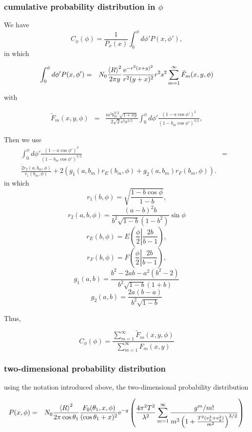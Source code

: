 \documentclass[11pt]{article}
\newcommand{\e}{{\rm e}}
\begin{document}
{{{{%
\subsubsection{cumulative probability distribution in $\phi$}

We have
$$C_{\phi}(\phi)=\frac{1}{P_x(x)}\int_{0}^{\phi}d\phi'P(x,\phi'),$$
in which


\begin{eqnarray}
\int_{0}^{\phi}d\phi'P(x,\phi')&=&N_{0}\frac{\left<R\right>^{2}}{2\pi y}\frac{\e^{-r^{2}(x+y)^{2}}}{r^{2}(y+x)^{2}}
r^{2}s^{2}
\sum_{m=1}^{\infty}\tilde {F}_{m}(x,y,\phi)
\end{eqnarray}

with

\begin{eqnarray} \tilde F_{m}(x,y,\phi)&=&\frac{m^{3}b_{m}^{3/2}\sqrt{1+xy}}{2\sqrt{2}s^{3}a^{3/2}}\int_{0}^{\phi}d\phi'\frac{\left(1-a\cos\phi'\right)^{2}}{(1-b_m\cos\phi')^{3/2}},
\end{eqnarray}


Then we use
\begin{eqnarray}
\int_{0}^{\phi}d\phi'\frac{\left(1-a\cos\phi' \right)^{2}}{(1-b_m\cos\phi')^{3/2}}&=&\\
\frac{2r_{2}(a,b_m,\phi)}{r_{1}(b_m,\phi)}+2(g_{1}(a,b_m)r_{E}(b_m,\phi)+g_{2}(a,b_m)r_{F}(b_m,\phi)).
\end{eqnarray}
in which
$$r_{1}(b,\phi)=\sqrt{\frac{1-b\cos\phi}{1-b}},$$
$$r_{2}(a,b,\phi)=\frac{(a-b)^{2}b}{b^{2}\sqrt{1-b}(1-b^{2})}\sin\phi$$
$$r_{E}(b,\phi)=E\left(\frac{\phi}{2}\left|\frac{2b}{b-1}\right.\right),$$
$$r_{F}(b,\phi)=F\left(\frac{\phi}{2}\left|\frac{2b}{b-1}\right.\right),$$
$$g_{1}(a,b)=\frac{b^{2}-2ab-a^{2}(b^{2}-2)}{b^{2}\sqrt{1-b}(1+b)}$$
$$g_{2}(a,b)=\frac{2a(b-a)}{b^{2}\sqrt{1-b}}$$

Thus,

$$C_{\phi}(\phi)=\frac{\sum_{m=1}^{\infty} \tilde F_{m}(x,y,\phi)}{\sum_{m=1}^{\infty} F_{m}(x,y)}$$

\subsubsection{two-dimensional probability distribution}

using the notation introduced above, the two-dimensional probability distribution

\begin{eqnarray}
P(x,\phi)&=&N_{0}\frac{\left<R\right>^{2}}{2\pi\cos\theta_{1}}\frac{F_{0}(\theta_{1},x,\phi)}{(\cos{\theta_{1}}+x)^{2}}
\e^{-g}\left(\frac{4\pi^{2}T^{2}}{\lambda^{2}}\sum_{m=1}^{\infty}\frac{g^{m}/m!}{m^{2}\left(1+\frac{T^{2}(v_{x}^{2}+v_{y}^{2})}{m^{2}}\right)^{3/2}}\right)\end{eqnarray}


}}}}
\end{document}
